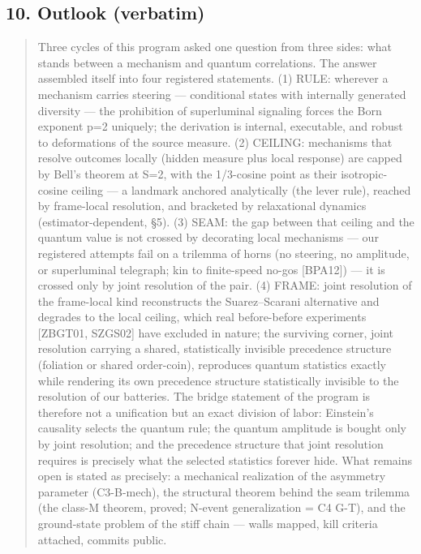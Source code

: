 \documentclass[
  11pt]{article}
\begin{document}
\subsection{10. Outlook (verbatim)}\label{outlook-verbatim}

\begin{quote}
Three cycles of this program asked one question from three sides: what
stands between a mechanism and quantum correlations. The answer
assembled itself into four registered statements. (1) RULE: wherever a
mechanism carries steering --- conditional states with internally
generated diversity --- the prohibition of superluminal signaling forces
the Born exponent p=2 uniquely; the derivation is internal, executable,
and robust to deformations of the source measure. (2) CEILING:
mechanisms that resolve outcomes locally (hidden measure plus local
response) are capped by Bell's theorem at S=2, with the 1/3-cosine point
as their isotropic-cosine ceiling --- a landmark anchored analytically
(the lever rule), reached by frame-local resolution, and bracketed by
relaxational dynamics (estimator-dependent, \S5). (3) SEAM: the gap
between that ceiling and the quantum value is not crossed by decorating
local mechanisms --- our registered attempts fail on a trilemma of horns
(no steering, no amplitude, or superluminal telegraph; kin to
finite-speed no-gos {[}BPA12{]}) --- it is crossed only by joint
resolution of the pair. (4) FRAME: joint resolution of the frame-local
kind reconstructs the Suarez--Scarani alternative and degrades to the
local ceiling, which real before-before experiments {[}ZBGT01, SZGS02{]}
have excluded in nature; the surviving corner, joint resolution carrying
a shared, statistically invisible precedence structure (foliation or
shared order-coin), reproduces quantum statistics exactly while
rendering its own precedence structure statistically invisible to the
resolution of our batteries. The bridge statement of the program is
therefore not a unification but an exact division of labor: Einstein's
causality selects the quantum rule; the quantum amplitude is bought only
by joint resolution; and the precedence structure that joint resolution
requires is precisely what the selected statistics forever hide. What
remains open is stated as precisely: a mechanical realization of the
asymmetry parameter (C3-B-mech), the structural theorem behind the seam
trilemma (the class-M theorem, proved; N-event generalization = C4 G-T),
and the ground-state problem of the stiff chain --- walls mapped, kill
criteria attached, commits public.
\end{quote}
\end{document}
